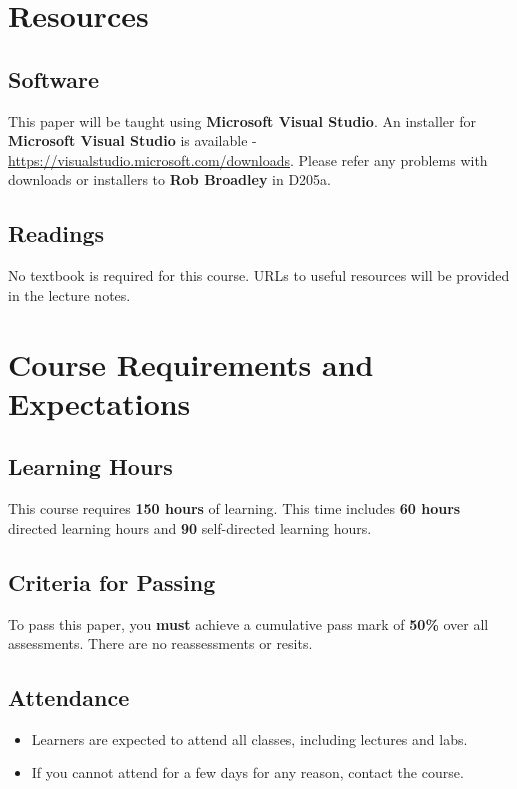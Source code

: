 \documentclass{article}
\begin{document}
\section*{Resources} 

\subsection*{Software}
This paper will be taught using \textbf{Microsoft Visual Studio}. An installer for \textbf{Microsoft Visual Studio} is available - \href{https://visualstudio.microsoft.com/downloads}{https://visualstudio.microsoft.com/downloads}. Please refer any problems with downloads or installers to \textbf{Rob Broadley} in D205a.

\subsection*{Readings}
No textbook is required for this course. URLs to useful resources will be provided in the lecture notes.

\section*{Course Requirements and Expectations}

\subsection*{Learning Hours}
This course requires \textbf{150 hours} of learning. This time includes \textbf{60 hours} directed learning hours and \textbf{90} self-directed learning hours.

\subsection*{Criteria for Passing}
To pass this paper, you \textbf{must} achieve a cumulative pass mark of \textbf{50\%} over all assessments. There are no reassessments or resits. 

\subsection*{Attendance}
\begin{itemize}
	\item Learners are expected to attend all classes, including lectures and labs.
	\item If you cannot attend for a few days for any reason, contact the course.
\end{itemize} 
\end{document}
